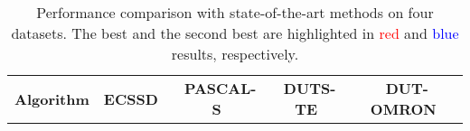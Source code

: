 \documentclass{article}
\begin{document}
\begin{table*}[t]
  \caption{Performance comparison with state-of-the-art methods on four datasets. The best and the second best are highlighted in \textcolor{red}{red} and \textcolor{blue}{blue} results, respectively.}
  \vspace{-0.2cm}
  \label{table: performance}
  \renewcommand\tabcolsep{2.35pt}
  \renewcommand\arraystretch{1.0}
  \centering
  \footnotesize
  \begin{tabular}{l|cccc|cccc|cccc|cccc}
     \hline
     \hline
     \multirow{2}{*}{\textbf{Algorithm}}  & \multicolumn{4}{c|}{\textbf{ECSSD}~\cite{yan2013hierarchical}} & \multicolumn{4}{c|}{\textbf{PASCAL-S}~\cite{li2014secrets}} & \multicolumn{4}{c|}{\textbf{DUTS-TE}~\cite{wang2017learning}} & \multicolumn{4}{c}{\textbf{DUT-OMRON}~\cite{yang2013saliency}}\\
      

\end{tabular}
\end{table*}
\end{document}
